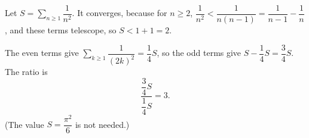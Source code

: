 Let $S=\displaystyle\sum_{n\ge1}\dfrac1{n^2}$. It converges, because for $n\ge2$, $\dfrac1{n^2}<\dfrac1{n(n-1)}=\dfrac1{n-1}-\dfrac1n$, and these terms telescope, so $S<1+1=2$.

The even terms give $\displaystyle\sum_{k\ge1}\dfrac1{(2k)^2}=\dfrac14S$, so the odd terms give $S-\dfrac14S=\dfrac34S$. The ratio is
\[\dfrac{\dfrac34S}{\dfrac14S}=\boxed{3}.\]
(The value $S=\dfrac{\pi^2}6$ is not needed.)
